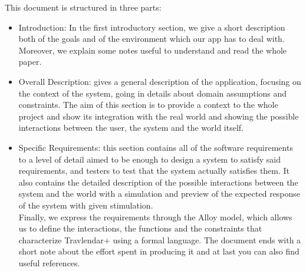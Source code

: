 This document is structured in three parts:
\begin{itemize}
	\item Introduction: In the first introductory section, we give a short description both of the goals and of the environment which our app has to deal with. Moreover, we explain some notes useful to understand and read the whole paper. 
	\item Overall Description: gives a general description of the application, focusing on the context of the system, going in details about domain assumptions and constraints. The aim of this section is to provide a context to the whole project and show its integration with the real world and showing the possible interactions between the user, the system and the world itself. 
	\item Specific Requirements: this section contains all of the software requirements to a level of detail aimed to be enough to design a system to satisfy said requirements, and testers to test that the system actually satisfies them. It also contains the detailed description of the possible interactions between the system and the world with a simulation and preview of the expected response of the system with given stimulation. 
\\Finally, we express the requirements through the Alloy model, which allows us to define the interactions, the functions and the constraints that characterize Travlendar+ using a formal language.
The document ends with a short note about the effort spent in producing it and at last you can also find useful references.
\end{itemize}